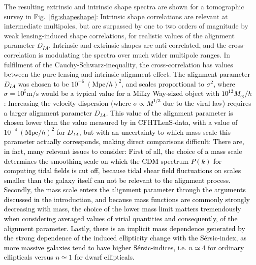 \documentclass[a4paper,fleqn,usenatbib]{mnras}
\newcommand\spirou[1]{\textcolor{black}{#1}}
\begin{document}
The resulting extrinsic and intrinsic shape spectra are shown for a tomographic survey in Fig.~\ref{fig:shapeshape}: Intrinsic shape correlations are relevant at intermediate multipoles, but are surpassed by one to two orders of magnitude by weak lensing-induced shape correlations, for realistic values of the alignment parameter $D_{IA}$. Intrinsic and extrinsic shapes are anti-correlated, and the cross-correlation is modulating the spectra over much wider multipole ranges. In fulfilment of the Cauchy-Schwarz-inequality, the cross-correlation has values between the pure lensing and intrinsic alignment effect. \spirou{The alignment parameter $D_{IA}$ was chosen to be $10^{-5}~(\mathrm{Mpc}/h)^2$, and scales proportional to $\sigma^2$, where $\sigma=10^5\mathrm{m}/\mathrm{s}$ would be a typical value for a Milky Way-sized object with $10^{12} M_\odot/h$: Increasing the velocity dispersion (where $\sigma\propto M^{1/3}$ due to the viral law) requires a larger alignment parameter $D_{IA}$. This value of the alignment parameter is chosen lower than the value measured by \citet{tugendhat_angular_2018} in CFHTLenS-data, with a value of $10^{-4}~(\mathrm{Mpc}/h)^2$ for $D_{IA}$, but with an uncertainty to which mass scale this parameter actually corresponds, making direct comparisons difficult: There are, in fact, many relevant issues to consider: First of all, the choice of a mass scale determines the smoothing scale on which the CDM-spectrum $P(k)$ for computing tidal fields is cut off, because tidal shear field fluctuations on scales smaller than the galaxy itself can not be relevant to the alignment process. Secondly, the mass scale enters the alignment parameter through the arguments discussed in the introduction, and because mass functions are commonly strongly decreasing with mass, the choice of the lower mass limit matters tremendously when considering averaged values of virial quantities and consequently, of the alignment parameter. Lastly, there is an implicit mass dependence generated by the strong dependence of the induced ellipticity change with the S{\'e}rsic-index, as more massive galaxies tend to have higher S{\'e}rsic-indices, i.e. $n\simeq 4$ for ordinary ellipticals versus $n\simeq 1$ for dwarf ellipticals.}
\end{document}
